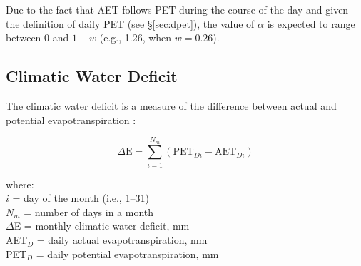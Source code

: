 Due to the fact that AET follows PET during the course of the day and given the definition of daily PET (see \S \ref{sec:dpet}), the value of $\alpha$ is expected to range between 0 and $1+w$ (e.g., 1.26, when $w=0.26$). 

\subsection{Climatic Water Deficit}
\label{sec:cwd}
The climatic water deficit is a measure of the difference between actual and potential evapotranspiration \parencite{stephenson98}:

\begin{equation}
\label{eq:cwd}
	\Delta\text{E} = \sum_{i=1}^{N_m} \left(
	                 \text{PET}_{Di} - \text{AET}_{Di} \right)
\end{equation}

\noindent where:\\
\indent $i$ = day of the month (i.e., 1--31) \\
\indent $N_m$ = number of days in a month \\
\indent $\Delta$E = monthly climatic water deficit, mm \\
\indent AET$_D$ = daily actual evapotranspiration, mm\\
\indent PET$_D$ = daily potential evapotranspiration, mm\\

